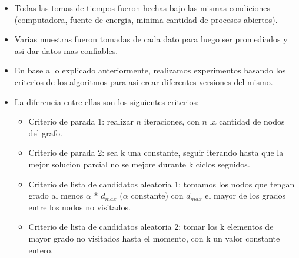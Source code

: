 \begin{itemize}
    \item Todas las tomas de tiempos fueron hechas bajo las mismas condiciones (computadora, fuente de energia, minima cantidad de procesos abiertos).
    \item Varias muestras fueron tomadas de cada dato para luego ser promediados y asi dar datos mas confiables.
    \item En base a lo explicado anteriormente, realizamos experimentos basando los criterios de los algoritmos para asi crear diferentes versiones del mismo.
    \item La diferencia entre ellas son los siguientes criterios:
    \begin{itemize}
        \item Criterio de parada 1: realizar $n$ iteraciones, con $n$ la cantidad de nodos del grafo.
        \item Criterio de parada 2: sea k una constante, seguir iterando hasta que la mejor solucion parcial no se mejore durante k ciclos seguidos.

        \item Criterio de lista de candidatos aleatoria 1: tomamos los nodos que tengan grado al menos $\alpha$ * $d_{max}$ ($\alpha$ constante) con $d_{max}$ el mayor de los grados entre los nodos no visitados.
        \item Criterio de lista de candidatos aleatoria 2: tomar los k elementos de mayor grado no visitados hasta el momento, con k un valor constante entero.


\end{itemize}
\end{itemize}

